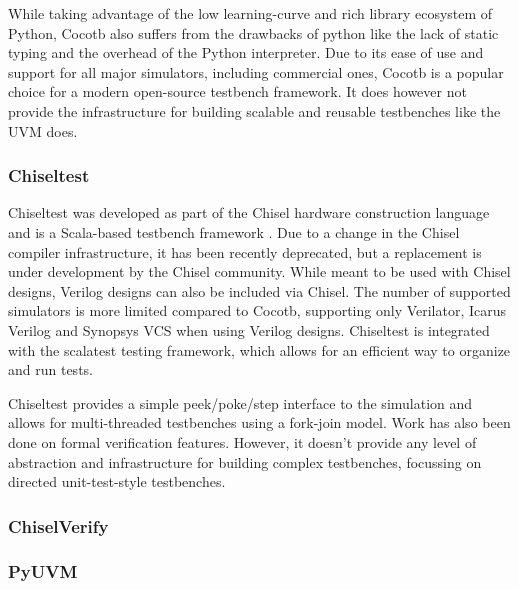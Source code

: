 \documentclass[12pt]{report}
\begin{document}
While taking advantage of the low learning-curve and rich library ecosystem of Python, Cocotb also suffers from the
drawbacks of python like the lack of static typing and the overhead of the Python interpreter. Due to its ease of use
and support for all major simulators, including commercial ones, Cocotb is a popular choice for a modern open-source
testbench framework. It does however not provide the infrastructure for building scalable and reusable testbenches
like the UVM does.

\subsubsection{Chiseltest} %

Chiseltest was developed as part of the Chisel hardware construction language and is a Scala-based testbench
framework \cite{chiseltest}. Due to a change in the Chisel compiler infrastructure, it has been recently deprecated,
but a replacement is under development by the Chisel community. While meant to be used with Chisel designs, Verilog
designs can also be included via Chisel. The number of supported simulators is more limited compared to Cocotb,
supporting only Verilator, Icarus Verilog and Synopsys VCS when using Verilog designs. Chiseltest is integrated with
the scalatest testing framework, which allows for an efficient way to organize and run tests.

Chiseltest provides a simple peek/poke/step interface to the simulation and allows for multi-threaded testbenches
using a fork-join model. Work has also been done on formal verification features. However, it doesn't provide any
level of abstraction and infrastructure for building complex
testbenches, focussing on directed unit-test-style testbenches.

\subsubsection{ChiselVerify} %

\subsubsection{PyUVM} %
\end{document}
